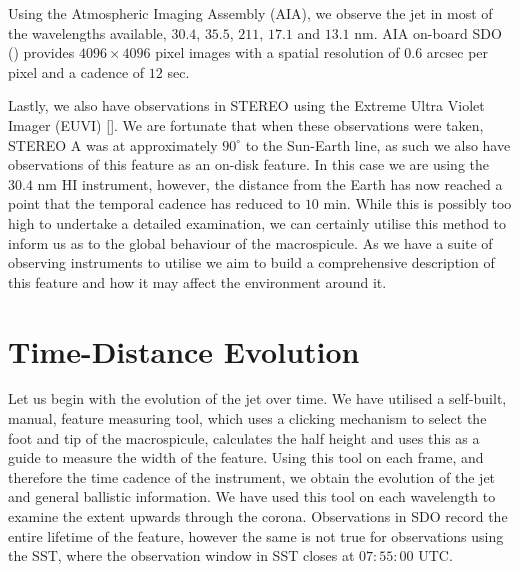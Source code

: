 Using the Atmospheric Imaging Assembly (AIA), we observe the jet in most of the wavelengths available, $30.4$, $35.5$, $211$, $17.1$ and $13.1$ nm.
AIA on-board SDO (\cite{AIAspec}) provides $4096 \times 4096$ pixel images with a spatial resolution of $0.6$ arcsec per pixel and a cadence of $12$ sec.

Lastly, we also have observations in STEREO using the Extreme Ultra Violet Imager (EUVI) [\cite{Defise2001}]. 
We are fortunate that when these observations were taken, STEREO A was at approximately $90^\circ$ to the Sun-Earth line, as such we also have observations of this feature as an on-disk feature.
In this case we are using the $30.4$ nm HI instrument, however, the distance from the Earth has now reached a point that the temporal cadence has reduced to $10$ min.
While this is possibly too high to undertake a detailed examination, we can certainly utilise this method to inform us as to the global behaviour of the macrospicule.
As we have a suite of observing instruments to utilise we aim to build a comprehensive description of this feature and how it may affect the environment around it.


\section{Time-Distance Evolution}
\label{sec:time_dist_sect}

Let us begin with the evolution of the jet over time. 
We have utilised a self-built, manual, feature measuring tool, which uses a clicking mechanism to select the foot and tip of the macrospicule, calculates the half height and uses this as a guide to measure the width of the feature.
Using this tool on each frame, and therefore the time cadence of the instrument, we obtain the evolution of the jet and general ballistic information.
We have used this tool on each wavelength to examine the extent upwards through the corona. 
Observations in SDO record the entire lifetime of the feature, however the same is not true for observations using the SST, where the observation window in SST closes at $07:55:00$ UTC.

